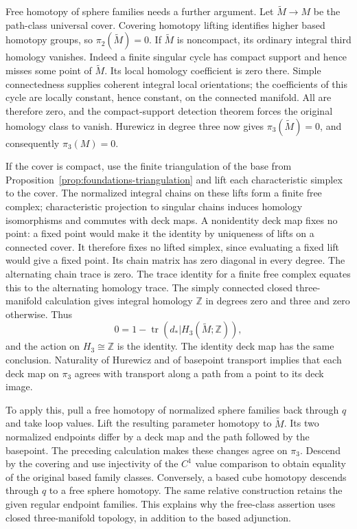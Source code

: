 Free homotopy of sphere families needs a further argument. Let
$\widetilde M\to M$ be the path-class universal cover. Covering
homotopy lifting identifies higher based homotopy groups, so
$\pi_2(\widetilde M)=0$. If $\widetilde M$ is noncompact, its ordinary
integral third homology vanishes. Indeed a finite singular cycle has
compact support and hence misses some point of $\widetilde M$. Its
local homology coefficient is zero there. Simple connectedness supplies
coherent integral local orientations; the coefficients of this cycle
are locally constant, hence constant, on the connected manifold. All
are therefore zero, and the compact-support detection theorem forces
the original homology class to vanish. Hurewicz in degree three now
gives $\pi_3(\widetilde M)=0$, and consequently $\pi_3(M)=0$.

If the cover is compact, use the finite triangulation of the base from
Proposition~\ref{prop:foundations-triangulation} and
lift each characteristic simplex to the cover. The normalized integral
chains on these lifts form a finite free complex; characteristic
projection to singular chains induces homology isomorphisms and commutes
with deck maps. A nonidentity deck map fixes no point: a fixed point
would make it the identity by uniqueness of lifts on a connected cover.
It therefore fixes no lifted simplex, since evaluating a fixed lift
would give a fixed point. Its chain matrix has zero diagonal in every
degree. The alternating chain trace is zero. The trace identity for a
finite free complex equates this to the alternating homology trace.
The simply connected closed three-manifold calculation gives integral
homology $\mathbb Z$ in degrees zero and three and zero otherwise.
Thus
\[
 0=1-\operatorname{tr}(d_*|H_3(\widetilde M;\mathbb Z)),
\]
and the action on $H_3\cong\mathbb Z$ is the identity. The identity
deck map has the same conclusion. Naturality of Hurewicz and of
basepoint transport implies that each deck map on $\pi_3$ agrees with
transport along a path from a point to its deck image.

To apply this, pull a free homotopy of normalized sphere families back
through $q$ and take loop values. Lift the resulting parameter homotopy
to $\widetilde M$. Its two normalized endpoints differ by a deck map
and the path followed by the basepoint. The preceding calculation makes
these changes agree on $\pi_3$. Descend by the covering and use
injectivity of the $C^1$ value comparison to obtain equality of the
original based family classes. Conversely, a based cube homotopy
descends through $q$ to a free sphere homotopy. The same relative
construction retains the given regular endpoint families. This explains
why the free-class assertion uses closed three-manifold topology, in
addition to the based adjunction.

